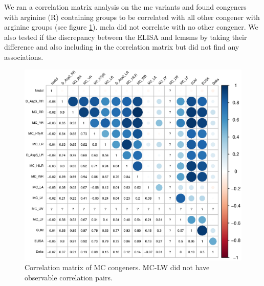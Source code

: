 We ran a correlation matrix analysis on the \gls{mc} variants and found congeners with arginine (R) containing groups to be correlated with all other congener with arginine groups (see figure \ref{fig:congenermatrix}). \gls{mcla} did not correlate with no other congener. We also tested if the discrepancy between the ELISA and \gls{lcmsms} by taking their difference and also including in the correlation matrix but did not find any associations. 



\begin{figure}[p]
	\includegraphics[width=\textwidth]{figures/congener_matrix}
	\caption{Correlation matrix of MC congeners. MC-LW did not have observable correlation pairs.}
	\label{fig:congenermatrix}
\end{figure}







